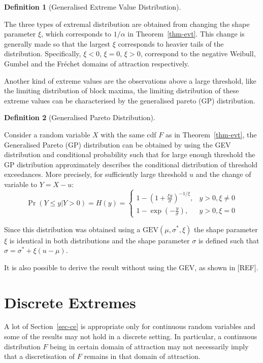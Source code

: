 \documentclass[
  10pt,
  a4paper,
]{scrreprt}
\theoremstyle{plain}
\theoremstyle{definition}
\newtheorem{definition}{Definition}[section]
\theoremstyle{remark}
\begin{document}
{\begin{definition}[Generalised Extreme Value
Distribution]
\end{definition}

The three types of extremal distribution are obtained from changing the
shape parameter \(\xi\), which corresponds to \(1/\alpha\) in
Theorem~\ref{thm-evt}. This change is generally made so that the largest
\(\xi\) corresponds to heavier tails of the distribution. Specifically,
\(\xi<0\), \(\xi=0\), \(\xi>0\), correspond to the negative Weibull,
Gumbel and the Fréchet domains of attraction respectively.

Another kind of extreme values are the observations above a large
threshold, like the limiting distribution of block maxima, the limiting
distribution of these extreme values can be characterised by the
generalised pareto (GP) distribution.

\begin{definition}[Generalised Pareto
Distribution]\protect\hypertarget{def-gp}{}\label{def-gp}

Consider a random variable \(X\) with the same cdf \(F\) as in
Theorem~\ref{thm-evt}, the Generalised Pareto (GP) distribution can be
obtained by using the GEV distribution and conditional probability such
that for large enough threshold the GP distribution approximately
describes the conditional distribution of threshold exceedances. More
precisely, for sufficiently large threshold \(u\) and the change of
variable to \(Y=X-u\): \[
\Pr(Y\le y | Y>0) = H(y) = \begin{cases}
1-\left(1+\displaystyle\frac{\xi y}{\sigma}\right)^{-1/\xi},&y>0,\xi\ne 0 \\
1-\exp\left(-\displaystyle\frac{y}{\sigma}\right),&y>0,\xi = 0
\end{cases}
\]

\end{definition}

Since this distribution was obtained using a
\(\text{GEV}(\mu,\sigma^*,\xi)\) the shape parameter \(\xi\) is
identical in both distributions and the shape parameter \(\sigma\) is
defined such that \(\sigma = \sigma^* + \xi(u-\mu)\).

It is also possible to derive the result without using the GEV, as shown
in {[}REF{]}.

\hypertarget{sec-disc}{%
\section{Discrete Extremes}\label{sec-disc}}

A lot of Section~\ref{sec-ce} is appropriate only for continuous random
variables and some of the results may not hold in a discrete setting. In
particular, a continuous distribution \(F\) being in certain domain of
attraction may not necessarily imply that a discretisation of \(F\)
remains in that domain of attraction.

}
\end{document}
